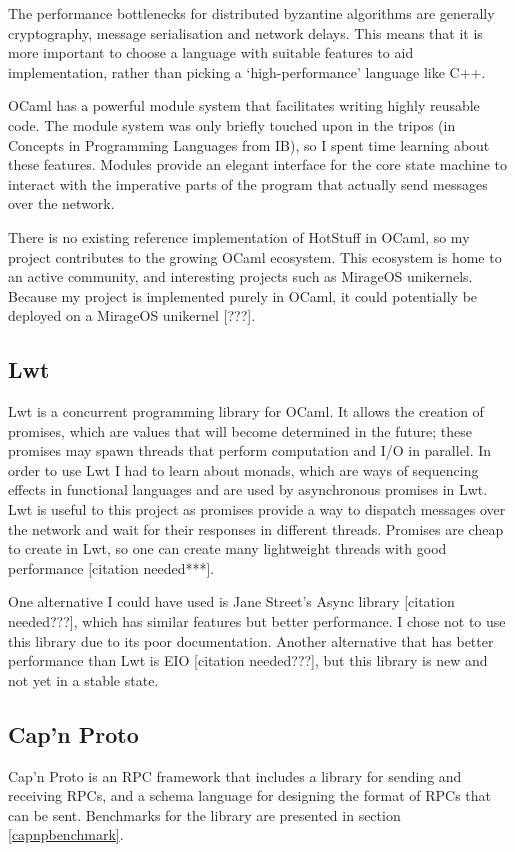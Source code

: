 The performance bottlenecks for distributed byzantine algorithms are generally cryptography, message serialisation and network delays. This means that it is more important to choose a language with suitable features to aid implementation, rather than picking a `high-performance' language like C++.

OCaml has a powerful module system that facilitates writing highly reusable code. The module system was only briefly touched upon in the tripos (in Concepts in Programming Languages from IB), so I spent time learning about these features. Modules provide an elegant interface for the core state machine to interact with the imperative parts of the program that actually send messages over the network.

There is no existing reference implementation of HotStuff in OCaml, so my project contributes to the growing OCaml ecosystem. This ecosystem is home to an active community, and interesting projects such as MirageOS unikernels. Because my project is implemented purely in OCaml, it could potentially be deployed on a MirageOS unikernel [???].

\subsection{Lwt}
Lwt is a concurrent programming library for OCaml. It allows the creation of promises, which are values that will become determined in the future; these promises may spawn threads that perform computation and I/O in parallel. In order to use Lwt I had to learn about monads, which are ways of sequencing effects in functional languages and are used by asynchronous promises in Lwt. Lwt is useful to this project as promises provide a way to dispatch messages over the network and wait for their responses in different threads. Promises are cheap to create in Lwt, so one can create many lightweight threads with good performance [citation needed***].

One alternative I could have used is Jane Street's Async library [citation needed???], which has similar features but better performance. I chose not to use this library due to its poor documentation. Another alternative that has better performance than Lwt is EIO [citation needed???], but this library is new and not yet in a stable state.

\subsection{Cap'n Proto}
Cap'n Proto is an RPC framework that includes a library for sending and receiving RPCs, and a schema language for designing the format of RPCs that can be sent. Benchmarks for the library are presented in section \ref{capnpbenchmark}.

